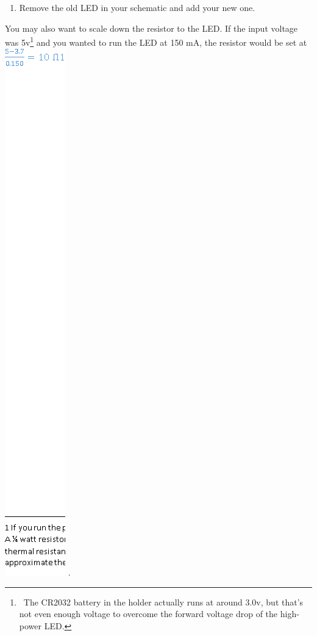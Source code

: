 \documentclass[letterpaper]{article}
\newcounter{saveenum}
\newcommand\liststyleRTFNumxi{%
\renewcommand\theenumi{\arabic{enumi}}
\renewcommand\theenumii{\alph{enumii}}
\renewcommand\theenumiii{\roman{enumiii}}
\renewcommand\theenumiv{\arabic{enumiv}}
\renewcommand\labelenumi{\theenumi.}
\renewcommand\labelenumii{\theenumii.}
\renewcommand\labelenumiii{\theenumiii.}
\renewcommand\labelenumiv{\theenumiv.}
}
\begin{document}
\bigskip

\liststyleRTFNumxi
\setcounter{saveenum}{\value{enumi}}
\begin{enumerate}
\setcounter{enumi}{\value{saveenum}}
\item {\sffamily\color[rgb]{0.30980393,0.5058824,0.7411765}
Remove the old LED in your schematic and add your new one.}
\end{enumerate}
{\sffamily\color[rgb]{0.30980393,0.5058824,0.7411765}
You may also want to scale down the resistor to the LED. If the input voltage was 5v\footnote{\ The CR2032 battery in
the holder actually runs at around 3.0v, but that's not even enough voltage to overcome the forward voltage drop of the
high-power LED.} and you wanted to run the LED at 150 mA, the resistor would be set at 
\includegraphics[width=1.0311in,height=8.9984in]{figures/ee4document-img048.png} .}
\end{document}
